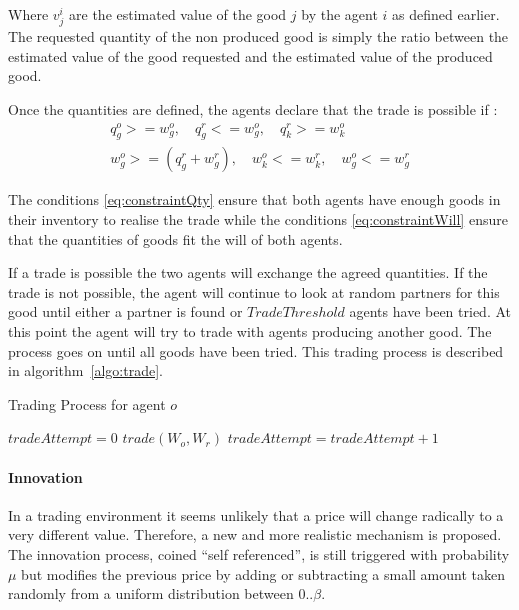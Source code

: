 \documentclass{wscpaperproc}
\begin{document}
 Where $v_j^i$ are the estimated value of the good $j$ by the agent $i$ as defined earlier. 
The requested quantity of the non produced good is simply the ratio between the estimated value of the good requested and the estimated value of the produced good.


Once the quantities are defined, the agents declare that the trade is possible if :
\begin{align}
q_g^o >= w_g^o,\quad q_g^r <= w_g^o,\quad q_k^r >= w_k^o \label{eq:constraintQty}\\
w_g^o>=(q_g^r+w_g^r),\quad w_k^o<=w_k^r,\quad w_g^o<=w_g^r \label{eq:constraintWill}
\end{align}


The conditions \ref{eq:constraintQty} ensure that both agents have enough goods in their inventory to realise the trade while the conditions \ref{eq:constraintWill} ensure that the quantities of goods fit the will of both agents.



If a trade is possible the two agents will exchange the agreed quantities. If the trade is not possible, the agent will continue to look at random partners for this good until either a partner is found or $TradeThreshold$ agents have been tried. At this point the agent will try to trade with agents producing another good. The process goes on until all goods have been tried. This trading process is described in algorithm~\ref{algo:trade}.

\begin{algorithm}
\caption{Trading Process for agent $o$}
\label{algo:trade}
	\begin{algorithmic}[1]
	\scriptsize
			\State $tradeAttempt = 0$
					\State $trade(W_o,W_r)$
				\Else
					\State $tradeAttempt = tradeAttempt + 1$					
				\EndIf
			\EndFor
		\EndFor
\end{algorithmic}
\end{algorithm}


\paragraph{Innovation} In a trading environment it seems unlikely that a price will change radically to a very different value. Therefore, a new and more realistic mechanism is proposed. The innovation process, coined ``self referenced'', is still triggered with probability $\mu$ 
but modifies the previous price by adding or subtracting a small amount taken randomly from a uniform  distribution between $0 .. \beta$.
\end{document}

